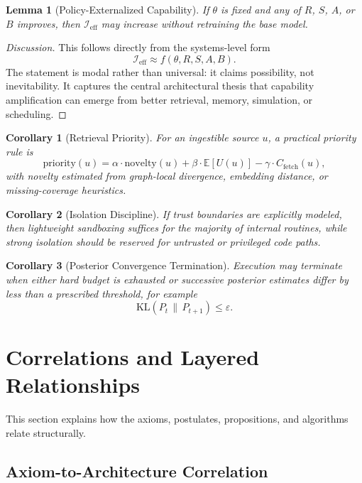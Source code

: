 \documentclass[11pt]{article}
\newtheorem{lemma}{Lemma}
\newtheorem{corollary}{Corollary}
\theoremstyle{definition}
\newcommand{\E}{\mathbb{E}}
\newcommand{\KL}{\mathrm{KL}}
\newcommand{\Ieff}{\mathcal{I}_{\mathrm{eff}}}
\begin{document}
\begin{lemma}[Policy-Externalized Capability]
If \(\theta\) is fixed and any of \(R\), \(S\), \(A\), or \(B\) improves, then \(\Ieff\) may increase without retraining the base model.
\end{lemma}

\begin{proof}[Discussion]
This follows directly from the systems-level form
\[
\Ieff \approx f(\theta, R, S, A, B).
\]
The statement is modal rather than universal: it claims possibility, not inevitability. It captures the central architectural thesis that capability amplification can emerge from better retrieval, memory, simulation, or scheduling.
\end{proof}

\begin{corollary}[Retrieval Priority]
For an ingestible source \(u\), a practical priority rule is
\[
\mathrm{priority}(u) = \alpha \cdot \mathrm{novelty}(u) + \beta \cdot \E[U(u)] - \gamma \cdot C_{\mathrm{fetch}}(u),
\]
with novelty estimated from graph-local divergence, embedding distance, or missing-coverage heuristics.
\end{corollary}

\begin{corollary}[Isolation Discipline]
If trust boundaries are explicitly modeled, then lightweight sandboxing suffices for the majority of internal routines, while strong isolation should be reserved for untrusted or privileged code paths.
\end{corollary}

\begin{corollary}[Posterior Convergence Termination]
Execution may terminate when either hard budget is exhausted or successive posterior estimates differ by less than a prescribed threshold, for example
\[
\KL(P_t \,\|\, P_{t+1}) \le \varepsilon.
\]
\end{corollary}

\section{Correlations and Layered Relationships}

This section explains how the axioms, postulates, propositions, and algorithms relate structurally.

\subsection{Axiom-to-Architecture Correlation}
\end{document}
